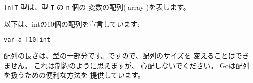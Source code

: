 \texttt{[n]T} 型は、型 \texttt{T} の \texttt{n} 個の
変数の配列( array )を表します。

以下は、intの10個の配列を宣言しています:

\begin{lstlisting}[numbers=none]
var a [10]int
\end{lstlisting}

配列の長さは、型の一部分です。ですので、配列のサイズを
変えることはできません。 これは制約のように思えますが、
心配しないでください。 Goは配列を扱うための便利な方法を
提供しています。